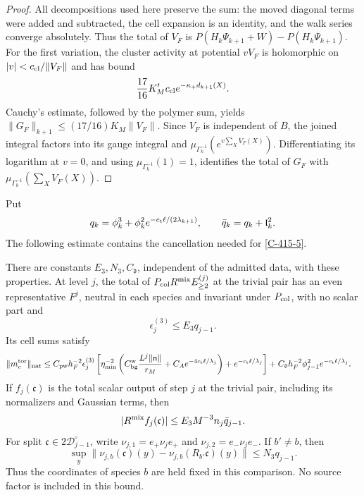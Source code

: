 \documentclass[11pt,letterpaper,reqno]{amsart}
\makeatletter
\theoremstyle{definition}
\newcommand{\ms@minorstart}{%
  \pushQED{\qed}\renewcommand{\qedsymbol}{$\blacksquare$}}
\newenvironment{lemma}[1][]{\ms@minorstart\ms@lemma[#1]}
  {\popQED\endms@lemma}
\theoremstyle{remark}
\makeatother
\begin{document}
\begin{proof}
All decompositions used here preserve the sum: the
moved diagonal terms were added and subtracted, the
cell expansion is an identity, and the walk series
converge absolutely.  Thus the total of $V_F$ is
$P(H_k\Psi_{k+1}+W)-P(H_k\Psi_{k+1})$.
For the first variation, the cluster activity at
potential $vV_F$ is holomorphic on
$|v|<c_{\rm cl}/\|V_F\|$ and has bound
\[
 \frac{17}{16}K_M'c_{\rm cl}
                         e^{-\kappa_+d_{k+1}(X)}.
\]
Cauchy's estimate, followed by the polymer sum, yields
$\|G_F\|_{k+1}\le(17/16)K_M\|V_F\|$.
Since $V_F$ is independent of $B$, the joined integral
factors into its gauge integral and
$\mu_{\Gamma_k^{-1}}(e^{v\sum_XV_F(X)})$.
Differentiating its logarithm at $v=0$, and using
$\mu_{\Gamma_k^{-1}}(1)=1$, identifies the total of
$G_F$ with $\mu_{\Gamma_k^{-1}}(\sum_XV_F(X))$.
\end{proof}

Put
\[
 q_k=\phi_k^3+\phi_k^2e^{-c_{\rm t}\ell/(2\lambda_{k+1})},
 \qquad \bar q_k=q_k+\mathfrak l_k^2.
\]
The following estimate contains the cancellation needed for
\cref{C-415-5}.

\begin{lemma}\label{C-415-10}
There are constants $E_3,N_3,C_{\mathfrak d}$, independent
of the admitted data, with these properties.
At level $j$, the total of
$P_{\rm col}R^{\rm mix}E_{\ge2}^{(j)}$ at the trivial pair
has an even representative $F^j$, neutral in each species
and invariant under $P_{\rm col}$, with no scalar part and
\begin{equation}\label{eq:qcdm2-representative-size}
 \epsilon_j^{(3)}\le E_3q_{j-1}.
\end{equation}
Its cell sums satisfy
\begin{align}
 \|m_c^{\rm tor}\|_{\rm nat}
 &\le C_{\rm pw}h_F^{-2}\epsilon_j^{(3)}
 \left[\eta_{\min}^{-2}
   \left(C_{\rm bg}^{\rm w}\frac{L^j\|\mathsf n\|}{r_M}
         +C_Ae^{-4c_{\rm t}\ell/\lambda_j}\right)
            +e^{-c_{\rm t}\ell/\lambda_j}\right]
       +C_{\mathfrak d}h_F^{-2}\phi_{j-1}^2
                       e^{-c_{\rm t}\ell/\lambda_j}.
 \label{eq:qcdm2-representative-cells}
\end{align}
If $f_j(\mathfrak c)$ is the total scalar output of step $j$
at the trivial pair, including its normalizers and Gaussian
terms, then
\begin{equation}\label{eq:qcdm2-mixed-total}
 |R^{\rm mix}f_j(\mathfrak c)|
       \le E_3M^{-3}n_j\bar q_{j-1}.
\end{equation}
For split $\mathfrak c\in2\mathscr D_{j-1}^\circ$, write
$\nu_{j,1}=e_+\nu_je_+$ and $\nu_{j,2}=e_-\nu_je_-$.
If $b'\ne b$, then
\begin{equation}\label{eq:qcdm2-cross-increment}
 \sup_y\|\nu_{j,b}(\mathfrak c)(y)
             -\nu_{j,b}(R_{b'}\mathfrak c)(y)\|
 \le N_3q_{j-1}.
\end{equation}
Thus the coordinates of species $b$ are held fixed in this
comparison. No source factor is included in this bound.
\end{lemma}
\end{document}
